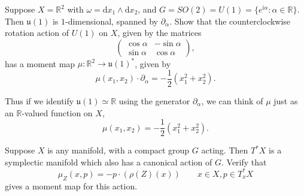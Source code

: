 \documentclass[12pt,letterpaper,reqno]{article}
\numberwithin{equation}{section}
\newcommand{\fu}{{\mathfrak u}}
\newcommand{\R}{\ensuremath{\mathbb R}}
\newcommand{\half}{\ensuremath{\frac{1}{2}}}
\newcommand{\I}{{\mathrm i}}
\newcommand{\de}{\mathrm{d}}
\begin{document}
\begin{exercise}
Suppose $X = \R^2$ with $\omega = \de x_1 \wedge \de x_2$, and
$G = SO(2) = U(1) = \{e^{\I \alpha}: \alpha \in \R \}$.
Then $\fu(1)$ is $1$-dimensional, spanned by $\partial_\alpha$.
Show that the counterclockwise rotation action of $U(1)$ on $X$,
given by the matrices
\begin{equation}
   \begin{pmatrix} \cos \alpha & - \sin \alpha \\ \sin \alpha & \cos \alpha \end{pmatrix},
 \end{equation}
has a moment map $\mu: \R^2 \to \fu(1)^*$, given by
\begin{equation}
  \mu(x_1,x_2) \cdot \partial_\alpha = -\half (x_1^2 + x_2^2).
\end{equation}
\end{exercise}
Thus if we identify $\fu(1) \simeq \R$ using the generator
$\partial_\alpha$, we can think of $\mu$ just as an $\R$-valued function
on $X$,
\begin{equation}
  \mu(x_1,x_2) = -\half (x_1^2 + x_2^2).
\end{equation}

\begin{exercise} \label{exc:cotangent-moment-map}
Suppose $X$ is any manifold, with a compact
group $G$ acting. Then $T^* X$ is a symplectic manifold
which also has a canonical action of $G$. Verify that
\begin{equation}
  \mu_Z(x,p) = -p \cdot (\rho(Z)(x)) \qquad x \in X, p \in T^*_x X
\end{equation}
gives a moment map for this action.
\end{exercise}


\printbibliography
\end{document}
